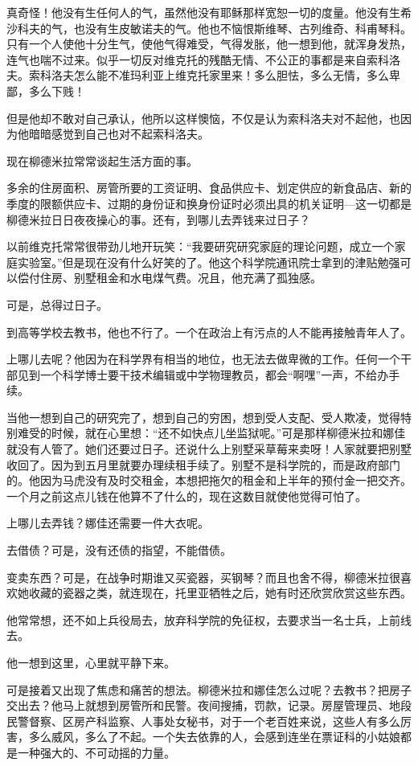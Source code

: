 真奇怪！他没有生任何人的气，虽然他没有耶稣那样宽恕一切的度量。他没有生希沙科夫的气，也没有生皮敏诺夫的气。他也不恼恨斯维琴、古列维奇、科甫琴科。只有一个人使他十分生气，使他气得难受，气得发胀，他一想到他，就浑身发热，连气也喘不过来。似乎一切反对维克托的残酷无情、不公正的事都是来自索科洛夫。索科洛夫怎么能不准玛利亚上维克托家里来！多么胆怯，多么无情，多么卑鄙，多么下贱！

但是他却不敢对自己承认，他所以这样懊恼，不仅是认为索科洛夫对不起他，也因为他暗暗感觉到自己也对不起索科洛夫。

现在柳德米拉常常谈起生活方面的事。

多余的住房面积、房管所要的工资证明、食品供应卡、划定供应的新食品店、新的季度的限额供应卡、过期的身份证和换身份证时必须出具的机关证明—这一切都是柳德米拉日日夜夜操心的事。还有，到哪儿去弄钱来过日子？

以前维克托常常很带劲儿地开玩笑：“我要研究研究家庭的理论问题，成立一个家庭实验室。”但是现在没有什么好笑的了。他这个科学院通讯院士拿到的津贴勉强可以偿付住房、别墅租金和水电煤气费。况且，他充满了孤独感。

可是，总得过日子。

到高等学校去教书，他也不行了。一个在政治上有污点的人不能再接触青年人了。

上哪儿去呢？他因为在科学界有相当的地位，也无法去做卑微的工作。任何一个干部见到一个科学博士要干技术编辑或中学物理教员，都会“啊嘿”一声，不给办手续。

当他一想到自己的研究完了，想到自己的穷困，想到受人支配、受人欺凌，觉得特别难受的时候，就在心里想：“还不如快点儿坐监狱呢。”可是那样柳德米拉和娜佳就没有人管了。她们还要过日子。还说什么上别墅采草莓来卖呀！人家就要把别墅收回了。因为到五月里就要办理续租手续了。别墅不是科学院的，而是政府部门的。他因为马虎没有及时交租金，本想把拖欠的租金和上半年的预付金一把交齐。一个月之前这点儿钱在他算不了什么的，现在这数目就使他觉得可怕了。

上哪儿去弄钱？娜佳还需要一件大衣呢。

去借债？可是，没有还债的指望，不能借债。

变卖东西？可是，在战争时期谁又买瓷器，买钢琴？而且也舍不得，柳德米拉很喜欢她收藏的瓷器之类，就连现在，托里亚牺牲之后，她有时还欣赏欣赏这些东西。

他常常想，还不如上兵役局去，放弃科学院的免征权，去要求当一名士兵，上前线去。

他一想到这里，心里就平静下来。

可是接着又出现了焦虑和痛苦的想法。柳德米拉和娜佳怎么过呢？去教书？把房子交出去？他马上就想到房管所和民警。夜间搜捕，罚款，记录。房屋管理员、地段民警督察、区房产科监察、人事处女秘书，对于一个老百姓来说，这些人有多么厉害，多么威风，多么了不起。一个失去依靠的人，会感到连坐在票证科的小姑娘都是一种强大的、不可动摇的力量。

